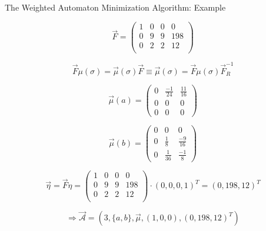 \documentclass[rgb, pdf]{beamer}
\begin{document}
\begin{frame}[allowframebreaks]{The Weighted Automaton Minimization Algorithm: Example}
\begin{minipage}{0.58\textwidth}
        \end{minipage}\begin{minipage}{0.4\textwidth}
         \[ \overrightarrow{F} = \begin{pmatrix}
                                    1 & 0 & 0 & 0 \\
                                    0 & 9 & 9 & 198 \\
                                    0 & 2 & 2 & 12  \\
                                \end{pmatrix}
        \]
        \end{minipage}

        \framebreak
        \[ \overrightarrow{F} \mu(\sigma) = \overrightarrow{\mu}(\sigma)\overrightarrow{F} 
        \equiv \overrightarrow{\mu}(\sigma) = \overrightarrow{F} \mu(\sigma) \overrightarrow{F}^{-1}_R \]
        
        \begin{minipage}{0.48\textwidth}
         \[
        \overrightarrow{\mu}(a) = 
        \begin{pmatrix}
            0 & \frac{-1}{24} & \frac{11}{16} \\
            0 & 0 & 0 \\
            0 & 0 & 0
        \end{pmatrix}
       \]
        \end{minipage}\begin{minipage}{0.48\textwidth}
         \[ \overrightarrow{\mu}(b) = 
            \begin{pmatrix}
                0 & 0 & 0 \\
                0 & \frac{1}{8}& \frac{-9}{16} \\
                0 & \frac{1}{36} & \frac{-1}{8}
            \end{pmatrix}
        \] 
        \end{minipage}
        
        \[ \overrightarrow{\eta} = \overrightarrow{F} \eta =  \begin{pmatrix}
                                    1 & 0 & 0 & 0 \\
                                    0 & 9 & 9 & 198 \\
                                    0 & 2 & 2 & 12  \\
                                \end{pmatrix} \cdot (0,0,0,1)^T = (0, 198, 12)^T \]

        \[\Rightarrow \overrightarrow{\mathcal{A}} = (3, \{a, b\}, \overrightarrow{\mu}, (1,0,0), (0, 198, 12)^T)\]
    \end{frame}
    
\end{document}
